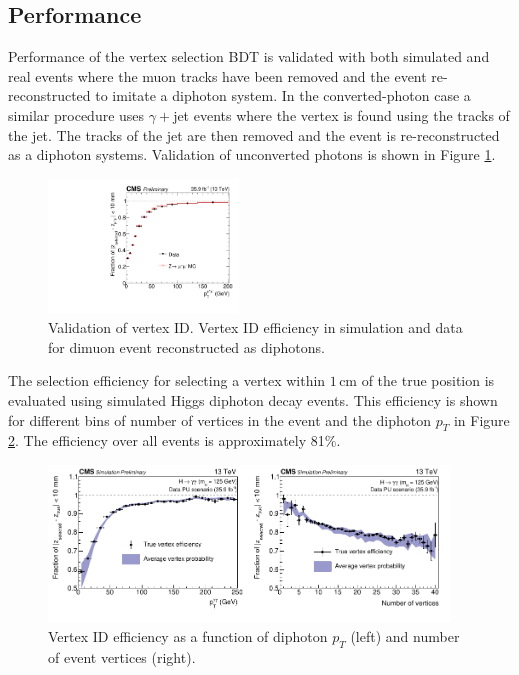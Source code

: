 \subsection{Performance}
Performance of the vertex selection BDT is validated with both simulated and real \Zmumu events where the muon tracks have been removed and the event re-reconstructed to imitate a diphoton system. 
In the converted-photon case a similar procedure uses $\gamma + $jet events where the vertex is found using the tracks of the jet. 
The tracks of the jet are then removed and the event is re-reconstructed as a diphoton systems. Validation of unconverted photons is shown in Figure \ref{fig:object_reco:vertex_id_valid}. 
\begin{figure}[h!]
    \includegraphics[width=0.45\textwidth]{figures/object_reco/CMS-PAS-HIG-16-040_Figure_003.pdf}
    \caption{Validation of vertex ID. Vertex ID efficiency in simulation and data for dimuon event reconstructed as diphotons.}
        \label{fig:object_reco:vertex_id_valid}
\end{figure}

The selection efficiency for selecting a vertex within $1$\,cm of the true position is evaluated using simulated Higgs diphoton decay events. This efficiency is shown for different bins of number of vertices in the event and the diphoton $p_{T}$ in Figure \ref{fig:object_reco:vertex_id_efficiency}. The efficiency over all events is approximately 81\%.
\begin{figure}[h!]
    \includegraphics[width=0.95\textwidth]{figures/object_reco/CMS-PAS-HIG-16-040_Figure_004.pdf}
    \caption{Vertex ID efficiency as a function of diphoton $p_T$ (left) and number of event vertices (right).}
        \label{fig:object_reco:vertex_id_efficiency}
\end{figure}

